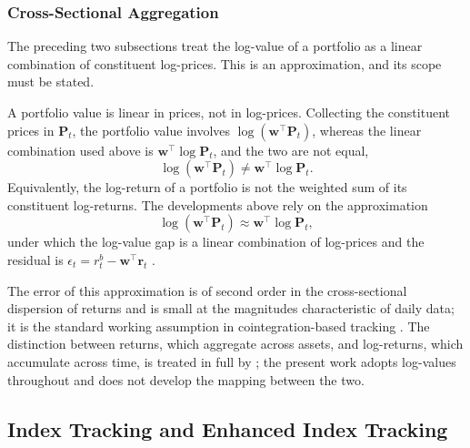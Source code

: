 \documentclass[12pt,a4paper]{article}
\begin{document}
\subsubsection{Cross-Sectional Aggregation}
\label{sec:aggregation}

The preceding two subsections treat the log-value of a portfolio as a
linear combination of constituent log-prices. This is an approximation,
and its scope must be stated.

A portfolio value is linear in prices, not in log-prices. Collecting the
constituent prices in $\mathbf{P}_t$, the portfolio value involves
$\log(\mathbf{w}^\top\mathbf{P}_t)$, whereas the linear combination used
above is $\mathbf{w}^\top\log\mathbf{P}_t$, and the two are not equal,
\begin{equation}
    \log\!\left(\mathbf{w}^\top\mathbf{P}_t\right)
    \neq \mathbf{w}^\top\log\mathbf{P}_t.
\end{equation}
Equivalently, the log-return of a portfolio is not the weighted sum of its
constituent log-returns. The developments above rely on the approximation
\begin{equation}
    \log\!\left(\mathbf{w}^\top\mathbf{P}_t\right)
    \approx \mathbf{w}^\top\log\mathbf{P}_t,
\end{equation}
under which the log-value gap is a linear combination of log-prices and the
residual is $\epsilon_t=r_t^b-\mathbf{w}^\top\mathbf{r}_t$
\citep{BenidisFengPalomar2018}.

The error of this approximation is of second order in the cross-sectional
dispersion of returns and is small at the magnitudes characteristic of
daily data; it is the standard working assumption in cointegration-based
tracking \citep{AlexanderDimitriu2002}. The distinction between returns,
which aggregate across assets, and log-returns, which accumulate across
time, is treated in full by \citet{Meucci2010}; the present work adopts
log-values throughout and does not develop the mapping between the two.


\subsection{Index Tracking and Enhanced Index Tracking}
\label{sec:it_formulation}
\end{document}
